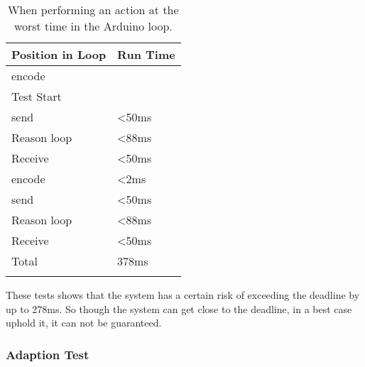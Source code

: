 \begin{center}
	\begin{table}[htbp]
	  \centering
	  \begin{tabular}{|l | l|}
		\toprule
		Position in Loop		& Run Time  \\ \midrule
		encode 			        & 		  	\\ \midrule
		Test Start		        &			\\
		send   			        & <50ms     \\
		Reason loop 	        & <88ms     \\ 
		Receive 		        & <50ms     \\
		encode 			        & <2ms      \\
		send   			        & <50ms     \\
		Reason loop 	        & <88ms	    \\
		Receive 		        & <50ms     \\
		Total			        & 378ms     \\
                                            \\ \bottomrule
	  \end{tabular}
	  \caption[An approximation of a worst case run time of each separate module]{When performing an action at the worst time in the Arduino loop.}
	\end{table}
 \label{Table:WorstRunTimeAprox}
\end{center}
These tests shows that the system has a certain risk of exceeding the deadline by up to 278ms. So though the system can get close to the deadline, in a best case uphold it, it can not be guaranteed.

\subsubsection{Adaption Test} 